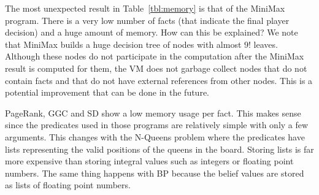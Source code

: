 The most unexpected result in Table~\ref{tbl:memory} is that of the MiniMax program. There is a
very low number of facts (that indicate the final player decision) and a huge
amount of memory. How can this be explained? We note that MiniMax builds a huge
decision tree of nodes with almost $9!$ leaves. Although these nodes do not participate
in the computation after the MiniMax result is computed for them, the VM does not garbage collect
nodes that do not contain facts and that do not have external references from other nodes.
This is a potential improvement that can be done in the future.

PageRank, GGC and SD show a low memory usage per fact. This makes sense since the predicates
used in those programs are relatively simple with only a few arguments.
This changes with the N-Queens problem where the predicates have lists representing the valid
positions of the queens in the board. Storing lists is far more expensive than storing integral
values such as integers or floating point numbers. The same thing happens with BP because
the belief values are stored as lists of floating point numbers.